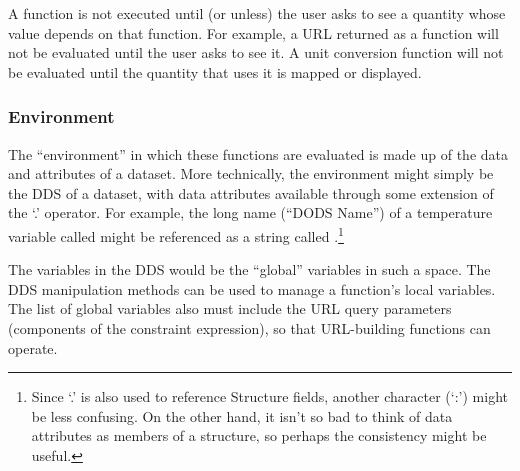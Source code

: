 \documentclass[10pt]{report}
\newcommand{\gui}{GUI}
\begin{document}
A function is not executed until (or unless) the user asks to see a
quantity whose value depends on that function.  For example, a URL
returned as a function will not be evaluated until the user asks to
see it.  A unit conversion function will not be evaluated until the
quantity that uses it is mapped or displayed.

\subsubsection{Environment}

The ``environment'' in which these functions are evaluated is made up
of the data and attributes of a dataset.  More technically, the
environment might simply be the DDS of a dataset, with data attributes
available through some extension of the `.' operator.  For example,
the long name (``DODS Name'') of a temperature variable called
 might be referenced as a string called
.\footnote{Since `.' is also used to reference
  Structure fields, another character (`:') might be less confusing.
  On the other hand, it isn't so bad to think of data attributes as
  members of a structure, so perhaps the consistency might be useful.}

The variables in the DDS would be the ``global'' variables in such a
space.  The DDS manipulation methods can be used to manage a
function's local variables.  The list of global variables also must
include the URL query parameters (components of the constraint
expression), so that URL-building functions can operate.

\cbstart




%
%
\end{document}
